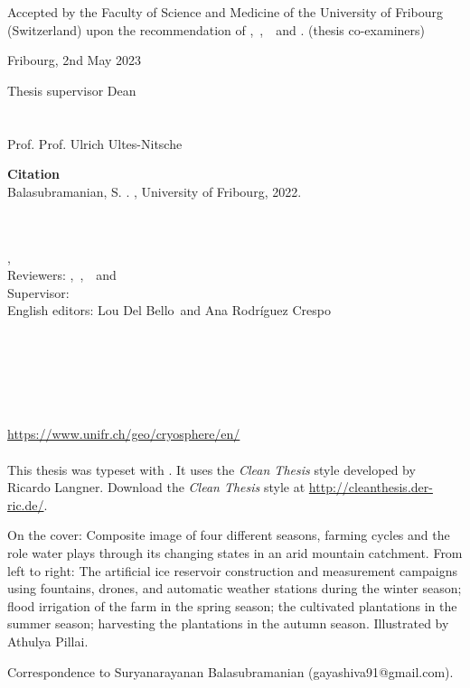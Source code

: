 
Accepted by the Faculty of Science and Medicine of the University of Fribourg (Switzerland)
upon the recommendation of \thesisFirstReviewer,\ \thesisSecondReviewer,\ \thesisThirdReviewer\ and \thesisFourthReviewer. (thesis co-examiners)

\bigskip
Fribourg, 2nd May 2023
\bigskip

Thesis supervisor
\hfill
Dean\\
\\
\\
Prof. \thesisFirstSupervisor            
\hfill
Prof. Ulrich Ultes-Nitsche
\\
\newpage


\vfill
{\large \textbf{Citation} \\}
Balasubramanian, S. \thesisTitle . \thesisUniversityDepartment, University of Fribourg, 2022.

\hfill
\vfill
{
	\small
	\textbf{\thesisName} \\
	\textit{\thesisTitle} \\
	\thesisSubject, \thesisDate \\
	Reviewers: \thesisFirstReviewer,\ \thesisSecondReviewer,\ \thesisThirdReviewer\ and \thesisFourthReviewer \\
	Supervisor: \thesisFirstSupervisor \\
	English editors: Lou Del Bello\ and Ana Rodríguez Crespo\\[1.5em]
	\textbf{\thesisUniversity} \\
	\textit{\thesisUniversityGroup} \\
	\thesisUniversityDepartment \\
	\thesisUniversityStreetAddress \\
	\thesisUniversityCity \\
	\thesisUniversityPostalCode \\
  \url{https://www.unifr.ch/geo/cryosphere/en/}\\
\\
  This thesis was typeset with \LaTeXe.
  It uses the \textit{Clean Thesis} style developed by Ricardo Langner.
  Download the \textit{Clean Thesis} style at \url{http://cleanthesis.der-ric.de/}.

  On the cover: Composite image of four different seasons, farming cycles and the role water plays through its
  changing states in an arid mountain catchment. From left to right: The artificial ice reservoir construction and
  measurement campaigns using fountains, drones, and automatic weather stations during the winter season; flood
  irrigation of the farm in the spring season; the cultivated plantations in the summer season; harvesting the
  plantations in the autumn season. Illustrated by Athulya Pillai.

  Correspondence to Suryanarayanan Balasubramanian (gayashiva91@gmail.com).
}

